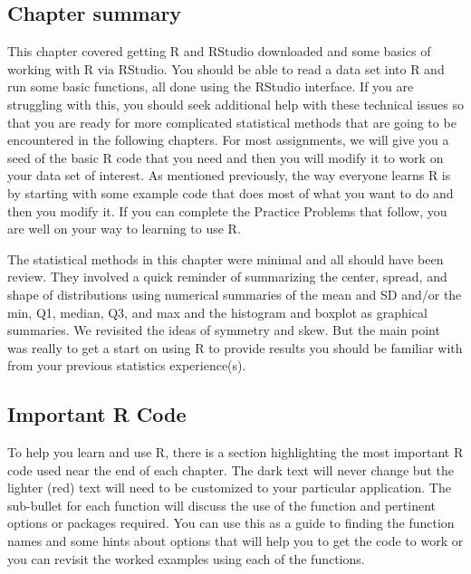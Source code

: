 \documentclass[]{article}
\begin{document}
\subsection{Chapter summary}\label{chapter-summary}

This chapter covered getting R and RStudio downloaded and some basics of
working with R via RStudio. You should be able to read a data set into R
and run some basic functions, all done using the RStudio interface. If
you are struggling with this, you should seek additional help with these
technical issues so that you are ready for more complicated statistical
methods that are going to be encountered in the following chapters. For
most assignments, we will give you a seed of the basic R code that you
need and then you will modify it to work on your data set of interest.
As mentioned previously, the way everyone learns R is by starting with
some example code that does most of what you want to do and then you
modify it. If you can complete the Practice Problems that follow, you
are well on your way to learning to use R.

The statistical methods in this chapter were minimal and all should have
been review. They involved a quick reminder of summarizing the center,
spread, and shape of distributions using numerical summaries of the mean
and SD and/or the min, Q1, median, Q3, and max and the histogram and
boxplot as graphical summaries. We revisited the ideas of symmetry and
skew. But the main point was really to get a start on using R to provide
results you should be familiar with from your previous statistics
experience(s).

\subsection{Important R Code}\label{important-r-code}

To help you learn and use R, there is a section highlighting the most
important R code used near the end of each chapter. The dark text will
never change but the lighter (red) text will need to be customized to
your particular application. The sub-bullet for each function will
discuss the use of the function and pertinent options or packages
required. You can use this as a guide to finding the function names and
some hints about options that will help you to get the code to work or
you can revisit the worked examples using each of the functions.
\end{document}
